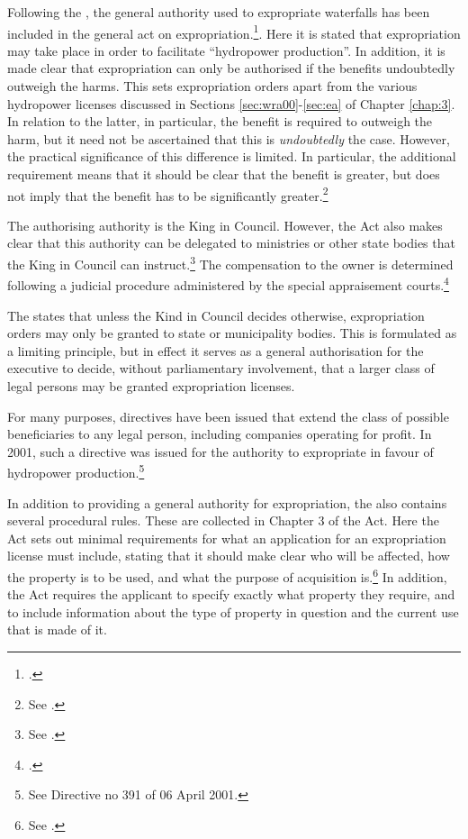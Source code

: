 Following the \cite{wra00}, the general authority used to expropriate waterfalls has been included in the general act on expropriation.\footcite[2 no 51]{ea59}. Here it is stated that expropriation may take place in order to facilitate ``hydropower production''. In addition, it is made clear that expropriation can only be authorised if the benefits undoubtedly outweigh the harms. This sets expropriation orders apart from the various hydropower licenses discussed in Sections \ref{sec:wra00}-\ref{sec:ea} of Chapter \ref{chap:3}. In relation to the latter, in particular, the benefit is required to outweigh the harm, but it need not be ascertained that this is {\it undoubtedly} the case. However, the practical significance of this difference is limited. In particular, the additional requirement means that it should be clear that the benefit is greater, but does not imply that the benefit has to be significantly greater.\footnote{See \cite{lovenskiold09}.}

The authorising authority is the King in Council. However, the Act also makes clear that this authority can be delegated to ministries or other state bodies that the King in Council can instruct.\footnote{See \cite[5]{ea59}.} The compensation to the owner is determined following a judicial procedure administered by the special appraisement courts.\footnote{\cite[2]{ea59}.} 

The \cite{ea59} states that unless the Kind in Council decides otherwise, expropriation orders may only be granted to state or municipality bodies. This is formulated as a limiting principle, but in effect it serves as a general authorisation for the executive to decide, without parliamentary involvement, that a larger class of legal persons may be granted expropriation licenses. 

For many purposes, directives have been issued that extend the class of possible beneficiaries to any legal person, including companies operating for profit. In 2001, such a directive was issued for the authority to expropriate in favour of hydropower production.\footnote{See Directive no 391 of 06 April 2001.} 

In addition to providing a general authority for expropriation, the \cite{ea59} also contains several procedural rules. These are collected in Chapter 3 of the Act. Here the Act sets out minimal requirements for what an application for an expropriation license must include, stating that it should make clear who will be affected, how the property is to be used, and what the purpose of acquisition is.\footnote{See \cite[11]{ea59}.} In addition, the Act requires the applicant to specify exactly what property they require, and to include information about the type of property in question and the current use that is made of it.

